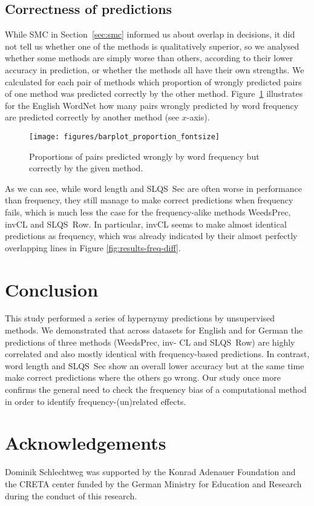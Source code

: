 \documentclass[11pt,a4paper]{article}
\begin{document}
\subsection{Correctness of predictions}

While SMC in Section~\ref{sec:smc} informed us about overlap in
decisions, it did not tell us whether one of the methods is
qualitatively superior, so we analysed whether some methods are simply
worse than others, according to their lower accuracy in prediction, or
whether the methods all have their own strengths. We calculated for
each pair of methods which proportion of wrongly predicted pairs of
one method was predicted correctly by the other
method. Figure~\ref{fig:prop-right-wrong} illustrates for the English
WordNet how many pairs wrongly predicted by word frequency are
predicted correctly by another method (see $x$-axis).

\begin{figure}[h!]
  \centering
  \texttt{[image: figures/barplot\_proportion\_fontsize]}
  \vspace{-2mm}
  \caption{Proportions of pairs predicted wrongly by word frequency but correctly by the given method.}
  \label{fig:prop-right-wrong}
\end{figure}

As we can see, while word length and SLQS~Sec are often worse in
performance than frequency, they still manage to make correct
predictions when frequency fails, which is much less the case for the
frequency-alike methods WeedsPrec, invCL and SLQS~Row. In particular,
invCL seems to make almost identical predictions as frequency, which
was already indicated by their almost perfectly overlapping lines in
Figure \ref{fig:results-freq-diff}.


\section{Conclusion}

This study performed a series of hypernymy predictions by unsupervised
methods. We demonstrated that across datasets for English and for
German the predictions of three methods (WeedsPrec, inv- CL and
SLQS~Row) are highly correlated and also mostly identical with
frequency-based predictions. In contrast, word length and SLQS~Sec
show an overall lower accuracy but at the same time make correct
predictions where the others go wrong. Our study once more confirms
the general need to check the frequency bias of a computational method
in order to identify frequency-(un)related effects.


\section*{Acknowledgements}

Dominik Schlechtweg was supported by the Konrad Adenauer Foundation
and the CRETA center funded by the German Ministry for Education and
Research during the conduct of this research.





\end{document}
